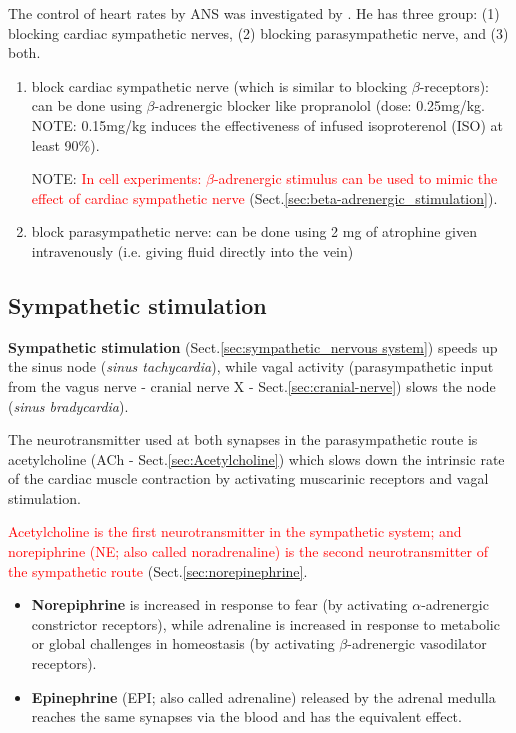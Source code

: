 The control of heart rates by ANS was investigated by \citep{Robinson1966}. He
has three group: (1) blocking cardiac sympathetic nerves, (2) blocking
parasympathetic nerve, and (3) both.
\begin{enumerate}
  \item block cardiac sympathetic nerve (which is similar to blocking
  $\beta$-receptors): can be done using $\beta$-adrenergic blocker like
  propranolol (dose: 0.25mg/kg. NOTE: 0.15mg/kg induces the  effectiveness of
  infused isoproterenol (ISO) at least 90\%).
  
NOTE: \textcolor{red}{In cell experiments: $\beta$-adrenergic stimulus can be
used to mimic the effect of cardiac sympathetic nerve}
(Sect.\ref{sec:beta-adrenergic_stimulation}).

  \item block parasympathetic nerve: can be done using 2 mg of atrophine given
  intravenously (i.e. giving fluid directly into the vein)
\end{enumerate}



\subsection{Sympathetic stimulation}
\label{sec:sympathetic-stimulation}

{\bf Sympathetic stimulation} (Sect.\ref{sec:sympathetic_nervous system}) speeds
up the sinus node ({\it sinus tachycardia}), while vagal activity
(parasympathetic input from the vagus nerve - cranial nerve X -
Sect.\ref{sec:cranial-nerve}) slows the node ({\it sinus bradycardia}).

The neurotransmitter used at both synapses in the parasympathetic route is
acetylcholine (ACh - Sect.\ref{sec:Acetylcholine}) which slows down the
intrinsic rate of the cardiac muscle contraction by activating muscarinic
receptors and vagal stimulation.

\textcolor{red}{Acetylcholine is the first neurotransmitter in the sympathetic
system; and norepiphrine (NE; also called noradrenaline) is the second
neurotransmitter of the sympathetic route} (Sect.\ref{sec:norepinephrine}.
\begin{itemize}
  \item {\bf Norepiphrine} is increased in response to fear (by activating
$\alpha$-adrenergic constrictor receptors), while adrenaline is increased in
response to metabolic or global challenges in homeostasis (by activating
$\beta$-adrenergic vasodilator receptors).

  \item  {\bf Epinephrine} (EPI; also called adrenaline) released by the adrenal
 medulla reaches the same synapses via the blood and has the equivalent effect.
\end{itemize}

